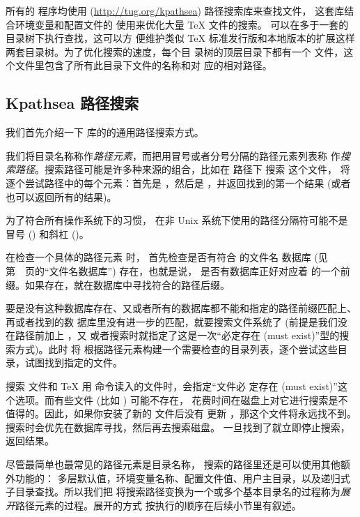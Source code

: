 \documentclass{article}
\begin{document}
所有的 \Webc{} 程序均使用 \KPS{} (\url{http://tug.org/kpathsea}) 路径搜索库来查找文件，
这套库结合环境变量和配置文件的
使用来优化大量 \TeX{} 文件的搜索。\Webc{} 可以在多于一套的目录树下执行查找，这可以方
便维护类似 \TeX{} 标准发行版和本地版本的扩展这样两套目录树。为了优化搜索的速度，每个目
录树的顶层目录下都有一个  文件，这个文件里包含了所有此目录下文件的名称和对
应的相对路径。

\subsection{Kpathsea 路径搜索}
\label{sec:kpathsea}

我们首先介绍一下 \KPS{} 库的的通用路径搜索方式。

我们将目录名称称作\emph{路径元素}，而把用冒号或者分号分隔的路径元素列表称
作\emph{搜索路径}。搜索路径可能是许多种来源的组合，比如在  路径下
搜索  这个文件，\KPS{} 将逐个尝试路径中的每个元素：首先是
，然后是 ，并返回找到的第一个结果 (或者
也可以返回所有的结果)。

为了符合所有操作系统下的习惯，\KPS{} 在非 Unix 系统下使用的路径分隔符可能不是冒号
(\samp{:}) 和斜杠 (\samp{/})。

在检查一个具体的路径元素  时，\KPS{} 首先检查是否有符合  的文件名
数据库 (见第~\pageref{sec:filename-database}~页的``文件名数据库'') 存在，也就是说，
是否有数据库正好对应着  的一个前缀。如果存在，就在数据库中寻找符合的路径后缀。

要是没有这种数据库存在、又或者所有的数据库都不能和指定的路径前缀匹配上、再或者找到的数
据库里没有进一步的匹配，就要搜索文件系统了 (前提是我们没在路径前加上 \samp{!!} ，又
或者搜索时就指定了这是一次``必定存在 (must exist)''型的搜索方式)。此时 \KPS{} 将
根据路径元素构建一个需要检查的目录列表，逐个尝试这些目录，试图找到指定的文件。

搜索  文件和 \TeX{} 用  命令读入的文件时，会指定``文件必
定存在 (must exist)''这个选项。而有些文件 (比如 ) 可能不存在，
花费时间在磁盘上对它进行搜索是不值得的。因此，如果你安装了新的  文件后没有
更新 ，那这个文件将永远找不到。搜索时会优先在数据库寻找，然后再去搜索磁盘。
一旦找到了就立即停止搜索，返回结果。

尽管最简单也最常见的路径元素是目录名称，\KPS{} 搜索的路径里还是可以使用其他额外功能的：
多层默认值，环境变量名称、配置文件值、用户主目录，以及递归式子目录查找。所以我们把 \KPS{}
将搜索路径变换为一个或多个基本目录名的过程称为\emph{展开}路径元素的过程。展开的方式
按执行的顺序在后续小节里有叙述。
\end{document}
